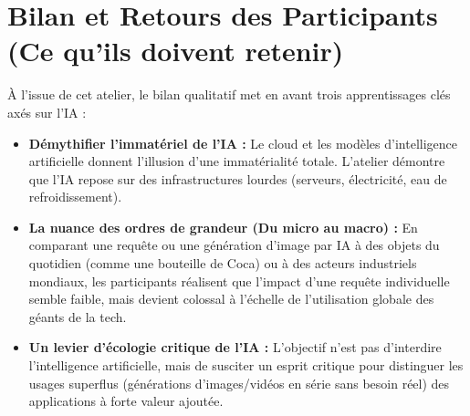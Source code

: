 \documentclass[11pt, a4paper]{article}
\begin{document}
\vspace{0.5cm}

\section{Bilan et Retours des Participants (Ce qu'ils doivent retenir)}

À l'issue de cet atelier, le bilan qualitatif met en avant trois apprentissages clés axés sur l'IA :

\begin{itemize}
    \item \textbf{Démythifier l'immatériel de l'IA :} Le cloud et les modèles d'intelligence artificielle donnent l'illusion d'une immatérialité totale. L'atelier démontre que l'IA repose sur des infrastructures lourdes (serveurs, électricité, eau de refroidissement).
    \item \textbf{La nuance des ordres de grandeur (Du micro au macro) :} En comparant une requête ou une génération d'image par IA à des objets du quotidien (comme une bouteille de Coca) ou à des acteurs industriels mondiaux, les participants réalisent que l'impact d'une requête individuelle semble faible, mais devient colossal à l'échelle de l'utilisation globale des géants de la tech.
    \item \textbf{Un levier d'écologie critique de l'IA :} L'objectif n'est pas d'interdire l'intelligence artificielle, mais de susciter un esprit critique pour distinguer les usages superflus (générations d'images/vidéos en série sans besoin réel) des applications à forte valeur ajoutée.
\end{itemize}
\end{document}
